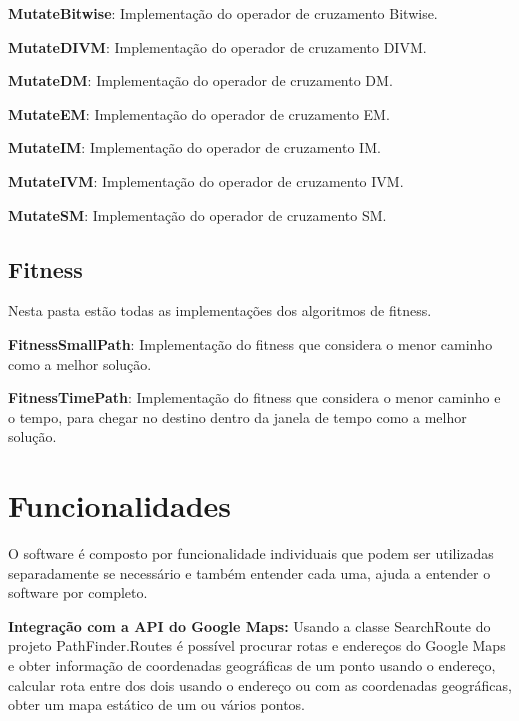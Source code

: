 \textbf{MutateBitwise}: Implementação do operador de cruzamento Bitwise.

\textbf{MutateDIVM}: Implementação do operador de cruzamento DIVM.

\textbf{MutateDM}: Implementação do operador de cruzamento DM.

\textbf{MutateEM}: Implementação do operador de cruzamento EM.

\textbf{MutateIM}: Implementação do operador de cruzamento IM.

\textbf{MutateIVM}: Implementação do operador de cruzamento IVM.

\textbf{MutateSM}: Implementação do operador de cruzamento SM.

\subsection{Fitness}

Nesta pasta estão todas as implementações dos algoritmos de fitness.

\textbf{FitnessSmallPath}: Implementação do fitness que considera o menor caminho como a melhor solução.

\textbf{FitnessTimePath}: Implementação do fitness que considera o menor caminho e o tempo, para chegar no destino dentro da janela de tempo como a melhor solução.

\section{Funcionalidades}
O software é composto por funcionalidade individuais que podem ser utilizadas separadamente se necessário e também entender cada uma, ajuda a entender o software por completo.

\textbf{Integração com a API do Google Maps:} Usando a classe SearchRoute do projeto PathFinder.Routes é possível procurar rotas e endereços do Google Maps e obter informação de coordenadas geográficas de um ponto usando o endereço, calcular rota entre dos dois usando o endereço ou com as coordenadas geográficas, obter um mapa estático de um ou vários pontos.






